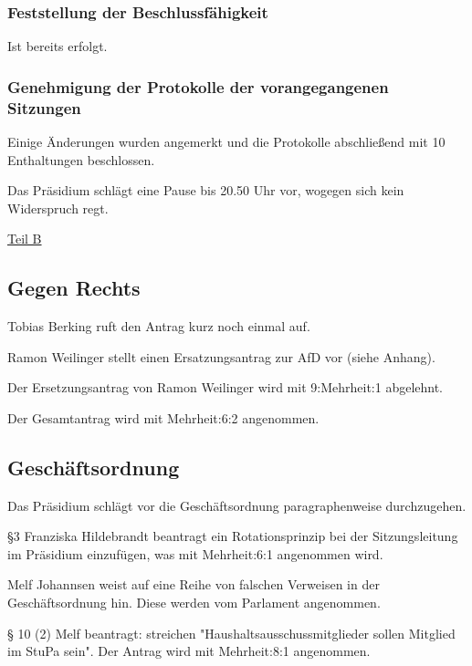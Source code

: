 \documentclass[ngerman,headheight=70pt]{scrartcl}
\begin{document}
    \subsubsection{Feststellung der Beschlussfähigkeit}

    Ist bereits erfolgt.

    \subsubsection{Genehmigung der Protokolle der vorangegangenen Sitzungen}

    Einige Änderungen wurden angemerkt und die Protokolle abschließend mit
    10 Enthaltungen beschlossen.

    Das Präsidium schlägt eine Pause bis 20.50 Uhr vor, wogegen sich kein
    Widerspruch regt.

    \vspace{1cm}
    {\Large \underline{Teil B}}

    \subsection{Gegen Rechts}

    Tobias Berking ruft den Antrag kurz noch einmal auf.

    Ramon Weilinger stellt einen Ersatzungsantrag zur AfD vor (siehe Anhang).

    Der Ersetzungsantrag von Ramon Weilinger wird mit 9:Mehrheit:1 abgelehnt.

    Der Gesamtantrag wird mit Mehrheit:6:2 angenommen.

    \subsection{Geschäftsordnung}

    Das Präsidium schlägt vor die Geschäftsordnung paragraphenweise durchzugehen.

    §3 Franziska Hildebrandt beantragt ein Rotationsprinzip bei der
    Sitzungsleitung im Präsidium einzufügen, was mit Mehrheit:6:1 angenommen wird.

    Melf Johannsen weist auf eine Reihe von falschen Verweisen in der
    Geschäftsordnung hin. Diese werden vom Parlament angenommen.

    § 10 (2) Melf beantragt: streichen "Haushaltsausschussmitglieder sollen
    Mitglied im StuPa sein". Der Antrag wird mit Mehrheit:8:1 angenommen.
\end{document}
